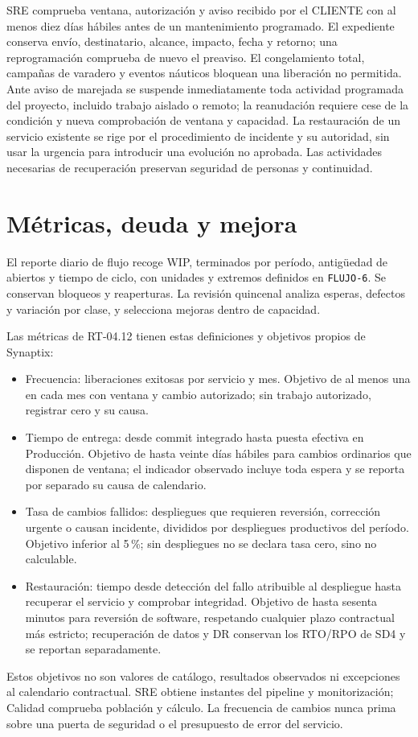 SRE comprueba ventana, autorización y aviso recibido por el CLIENTE con al menos diez días hábiles antes de un mantenimiento programado. El expediente conserva envío, destinatario, alcance, impacto, fecha y retorno; una reprogramación comprueba de nuevo el preaviso. El congelamiento total, campañas de varadero y eventos náuticos bloquean una liberación no permitida. Ante aviso de marejada se suspende inmediatamente toda actividad programada del proyecto, incluido trabajo aislado o remoto; la reanudación requiere cese de la condición y nueva comprobación de ventana y capacidad. La restauración de un servicio existente se rige por el procedimiento de incidente y su autoridad, sin usar la urgencia para introducir una evolución no aprobada. Las actividades necesarias de recuperación preservan seguridad de personas y continuidad. \parencites[cap.~10, restricción 12, p.~26; numeral 13.2, p.~29; cap.~15, RT-10.05, p.~34]{sd6-c07}[art.~20, p.~15]{sd6-ba}[RT-10.05, p.~22]{sd6-bt}

\section{Métricas, deuda y mejora}
El reporte diario de flujo recoge WIP, terminados por período, antigüedad de abiertos y tiempo de ciclo, con unidades y extremos definidos en \texttt{FLUJO-6}. Se conservan bloqueos y reaperturas. La revisión quincenal analiza esperas, defectos y variación por clase, y selecciona mejoras dentro de capacidad. \parencite[Flow Metrics, p.~5]{sd6-kanban}

Las métricas de RT-04.12 tienen estas definiciones y objetivos propios de Synaptix:
\begin{itemize}
\item Frecuencia: liberaciones exitosas por servicio y mes. Objetivo de al menos una en cada mes con ventana y cambio autorizado; sin trabajo autorizado, registrar cero y su causa.
\item Tiempo de entrega: desde commit integrado hasta puesta efectiva en Producción. Objetivo de hasta veinte días hábiles para cambios ordinarios que disponen de ventana; el indicador observado incluye toda espera y se reporta por separado su causa de calendario.
\item Tasa de cambios fallidos: despliegues que requieren reversión, corrección urgente o causan incidente, divididos por despliegues productivos del período. Objetivo inferior al 5\,\%; sin despliegues no se declara tasa cero, sino no calculable.
\item Restauración: tiempo desde detección del fallo atribuible al despliegue hasta recuperar el servicio y comprobar integridad. Objetivo de hasta sesenta minutos para reversión de software, respetando cualquier plazo contractual más estricto; recuperación de datos y DR conservan los RTO/RPO de SD4 y se reportan separadamente.
\end{itemize}
Estos objetivos no son valores de catálogo, resultados observados ni excepciones al calendario contractual. SRE obtiene instantes del pipeline y monitorización; Calidad comprueba población y cálculo. La frecuencia de cambios nunca prima sobre una puerta de seguridad o el presupuesto de error del servicio. \parencite[RT-04.12, p.~11; RT-10.09, p.~22]{sd6-bt}

